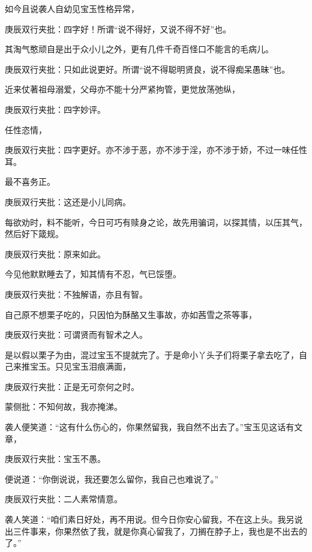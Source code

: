 \begin{parag}
    如今且说袭人自幼见宝玉性格异常，\begin{note}庚辰双行夹批：四字好！所谓“说不得好，又说不得不好”也。\end{note}其淘气憨顽自是出于众小儿之外，更有几件千奇百怪口不能言的毛病儿。\begin{note}庚辰双行夹批：只如此说更好。所谓“说不得聪明贤良，说不得痴呆愚昧”也。\end{note}近来仗著祖母溺爱，父母亦不能十分严紧拘管，更觉放荡弛纵，\begin{note}庚辰双行夹批：四字妙评。\end{note}任性恣情，\begin{note}庚辰双行夹批：四字更好。亦不涉于恶，亦不涉于淫，亦不涉于娇，不过一味任性耳。\end{note}最不喜务正。\begin{note}庚辰双行夹批：这还是小儿同病。\end{note}每欲劝时，料不能听，今日可巧有赎身之论，故先用骗词，以探其情，以压其气，然后好下箴规。\begin{note}庚辰双行夹批：原来如此。\end{note}今见他默默睡去了，知其情有不忍，气已馁堕。\begin{note}庚辰双行夹批：不独解语，亦且有智。\end{note}自己原不想栗子吃的，只因怕为酥酪又生事故，亦如茜雪之茶等事，\begin{note}庚辰双行夹批：可谓贤而有智术之人。\end{note}是以假以栗子为由，混过宝玉不提就完了。于是命小丫头子们将栗子拿去吃了，自己来推宝玉。只见宝玉泪痕满面，\begin{note}庚辰双行夹批：正是无可奈何之时。\end{note}\begin{note}蒙侧批：不知何故，我亦掩涕。\end{note}袭人便笑道：“这有什么伤心的，你果然留我，我自然不出去了。”宝玉见这话有文章，\begin{note}庚辰双行夹批：宝玉不愚。\end{note}便说道：“你倒说说，我还要怎么留你，我自己也难说了。”\begin{note}庚辰双行夹批：二人素常情意。\end{note}袭人笑道：“咱们素日好处，再不用说。但今日你安心留我，不在这上头。我另说出三件事来，你果然依了我，就是你真心留我了，刀搁在脖子上，我也是不出去的了。”
\end{parag}


